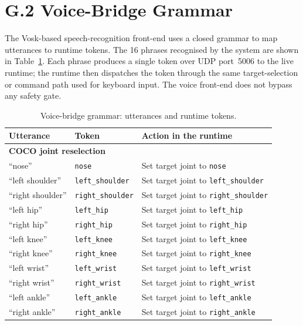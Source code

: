 \section*{G.2 Voice-Bridge Grammar}

The Vosk-based speech-recognition front-end uses a closed grammar to map utterances to runtime tokens. The 16 phrases recognised by the system are shown in Table~\ref{tab:app_g_grammar}. Each phrase produces a single token over UDP port~5006 to the live runtime; the runtime then dispatches the token through the same target-selection or command path used for keyboard input. The voice front-end does not bypass any safety gate.

\begin{table}[htbp]
\centering
\caption{Voice-bridge grammar: utterances and runtime tokens.}
\label{tab:app_g_grammar}
\begin{tabular}{|l|l|l|}
\hline
\textbf{Utterance} & \textbf{Token} & \textbf{Action in the runtime} \\
\hline
\multicolumn{3}{|l|}{\textbf{COCO joint reselection}} \\
\hline
``nose''            & \texttt{nose}            & Set target joint to \texttt{nose} \\
\hline
``left shoulder''   & \texttt{left\_shoulder}  & Set target joint to \texttt{left\_shoulder} \\
\hline
``right shoulder''  & \texttt{right\_shoulder} & Set target joint to \texttt{right\_shoulder} \\
\hline
``left hip''        & \texttt{left\_hip}       & Set target joint to \texttt{left\_hip} \\
\hline
``right hip''       & \texttt{right\_hip}      & Set target joint to \texttt{right\_hip} \\
\hline
``left knee''       & \texttt{left\_knee}      & Set target joint to \texttt{left\_knee} \\
\hline
``right knee''      & \texttt{right\_knee}     & Set target joint to \texttt{right\_knee} \\
\hline
``left wrist''      & \texttt{left\_wrist}     & Set target joint to \texttt{left\_wrist} \\
\hline
``right wrist''     & \texttt{right\_wrist}    & Set target joint to \texttt{right\_wrist} \\
\hline
``left ankle''      & \texttt{left\_ankle}     & Set target joint to \texttt{left\_ankle} \\
\hline
``right ankle''     & \texttt{right\_ankle}    & Set target joint to \texttt{right\_ankle} \\

\end{tabular}
\end{table}
